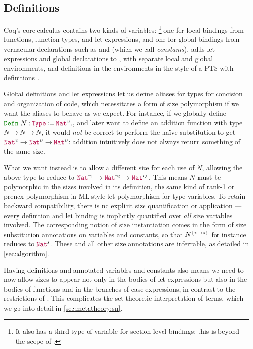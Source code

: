\subsection{Definitions}

Coq's core calculus contains two kinds of variables:%
\footnote{It also has a third type of variable for section-level bindings;
this is beyond the scope of \lang.}
one for local bindings from functions, function types, and let expressions,
and one for global bindings from vernacular declarations such as  and  (which we call \textit{constants}).
\lang adds let expressions and global declarations to \CIChat,
with separate local and global environments,
and definitions in the environments in the style of a PTS with definitions~\citep{pts}.

Global definitions and let expressions let us define aliases for types for concision and organization of code,
which necessitates a form of size polymorphism if we want the aliases to behave as we expect.
For instance, if we globally define $\Defn{N}{\Type{}}{\Nat^\upsilon}$,
and later want to define an addition function with type $N \rightarrow N \rightarrow N$,
it would \emph{not} be correct to perform the na\"ive substitution to get $\Nat^\upsilon \rightarrow \Nat^\upsilon \rightarrow \Nat^\upsilon$:
addition intuitively does not always return something of the same size.

What we want instead is to allow a different size for each use of $N$,
allowing the above type to reduce to $\Nat^{\upsilon_1} \rightarrow \Nat^{\upsilon_2} \rightarrow \Nat^{\upsilon_3}$.
This means $N$ must be polymorphic in the sizes involved in its definition,
the same kind of rank-1 or prenex polymorphism in ML-style let polymorphism for type variables.
To retain backward compatibility, there is no explicit size quantification or application ---
every definition and let binding is implicitly quantified over \emph{all} size variables involved.
The corresponding notion of size instantiation comes in the form of size substitution annotations on variables and constants, so that $N^{\{\upsilon \mapsto s\}}$ for instance reduces to $\Nat^s$.
These and all other size annotations are inferrable, as detailed in \autoref{sec:algorithm}.

Having definitions and annotated variables and constants also means we need to now allow sizes to appear
not only in the bodies of let expressions but also in the bodies of functions and in the branches of case expressions,
in contrast to the restrictions of \CIChatminus.
This complicates the set-theoretic interpretation of \lang terms,
which we go into detail in \autoref{sec:metatheory:sn}.

